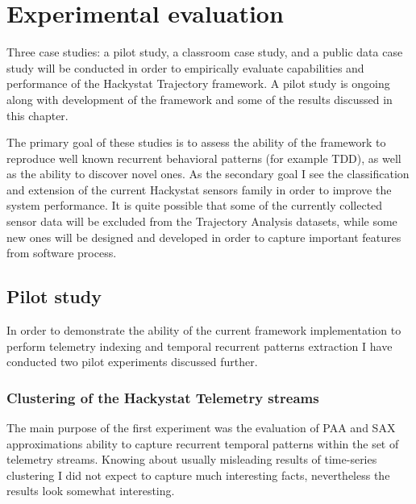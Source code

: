 \chapter{Experimental evaluation} \label{experiments}
Three case studies: a pilot study, a classroom case study, and a public data case study will be conducted in order to empirically evaluate capabilities and performance of the Hackystat Trajectory framework. A pilot study is ongoing along with development of the framework and some of the results discussed in this chapter.

The primary goal of these studies is to assess the ability of the framework to reproduce well known recurrent behavioral patterns (for example TDD), as well as the ability to discover novel ones. As the secondary goal I see the classification and extension of the current Hackystat sensors family in order to improve the system performance. It is quite possible that some of the currently collected sensor data will be excluded from the Trajectory Analysis datasets, while some new ones will be designed and developed in order to capture important features from software process. 

\section{Pilot study}\label{pilot.evaluation}
In order to demonstrate the ability of the current framework implementation to perform telemetry indexing and temporal recurrent patterns extraction I have conducted two pilot experiments discussed further. 

\subsection{Clustering of the Hackystat Telemetry streams}
The main purpose of the first experiment was the evaluation of PAA and SAX approximations ability to capture recurrent temporal patterns within the set of telemetry streams. Knowing about usually misleading results of time-series clustering \cite{citeulike:227029} I did not expect to capture much interesting facts, nevertheless the results look somewhat interesting.

